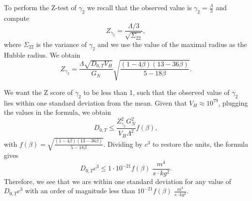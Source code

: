 \documentclass[aps,pra,amsmath,amssymb,amsthm,floatfix,nofootinbib,notitlepage,superscriptaddress,10pt]{revtex4-2}
\begin{document}
To perform the Z-test of $\gamma_2$ we recall that the observed value is $\gamma_2=\frac{\Lambda}{3}$ and compute
\begin{equation}
	Z_{\gamma_2}=\frac{\Lambda / 3}{\sqrt{\Sigma_{22}}},
\end{equation}
where $\Sigma_{22}$ is the variance of $\gamma_2$ and we use the value of the maximal radius as the Hubble radius.
We obtain
\begin{equation}
	\label{eq: Lambda_Ztest}
	Z_{\gamma_2}=\frac{ \Lambda  \sqrt{ D_{0,T} V_H}}{G_N}\sqrt{\frac{(1-4 \beta) (13-36 \beta)}{5-18 \beta }}.
\end{equation}

We want the Z score of $\gamma_2$ to be less than 1, such that the observed value of $\gamma_2$ lies within one standard deviation from the mean. Given that $V_H\approx 10^{79}$, plugging the values in the formula, we obtain
\begin{equation}
	D_{0,T}\leq\frac{Z_{\gamma_2}^2G_N^2}{V_H\Lambda^2}f(\beta),
\end{equation}
with $f(\beta)=\sqrt{\frac{(1-4 \beta) (13-36 \beta)}{5-18 \beta }}$. Dividing by $c^3$ to restore the units, the formula gives
\begin{equation}
	D_{0,T}c^3\leq 1\cdot 10^{-21}f(\beta) \; \frac{m^4}{s\cdot kg^2}.
\end{equation}
Therefore, we see that we are within one standard deviation for any value of $D_{0,T}c^3$ with an order of magnitude less than $10^{-21}f(\beta) \; \frac{m^4}{s\cdot kg^2}$.
\end{document}
